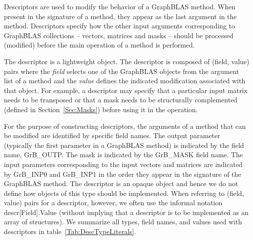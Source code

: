 Descriptors are used to modify the behavior of a GraphBLAS method.
When present in the signature of a method, they appear as the last argument in the method.
Descriptors specify how the other input arguments
corresponding to GraphBLAS collections -- vectors, matrices and masks -- should
be processed (modified) before the main operation of a method is performed.

The descriptor is a lightweight object.  The descriptor is composed
of (field, value) pairs where the \emph{field} selects one of the GraphBLAS objects
from the argument list of a method and the \emph{value} defines the indicated modification
associated with that object.  For example, a descriptor may specify that a particular 
input matrix needs to be transposed or that a mask needs to be structurally 
complemented (defined in Section~\ref{Sec:Masks}) before using it in the operation.

For the purpose of constructing descriptors, the arguments of a method
that can be modified are identified by specific field names. The output parameter (typically
the first parameter in a GraphBLAS method) is indicated by the field name, 
{\sf GrB\_OUTP}.  The mask is indicated by the {\sf GrB\_MASK} field name. The input parameters
corresponding to the input vectors and matrices are indicated by {\sf GrB\_INP0} and
{\sf GrB\_INP1} in the order they appear in the signature of the GraphBLAS method. 
The descriptor is an opaque object and hence we do not define how objects of this type should
be implemented.   When referring to (field, value) pairs for a descriptor, however, we often use the informal
notation {\sf descr[Field].Value} (without implying that a descriptor is to be implemented as an
array of structures).    We summarize all types, field names, and values used 
with descriptors in table~\ref{Tab:DescTypeLiterals}. 



